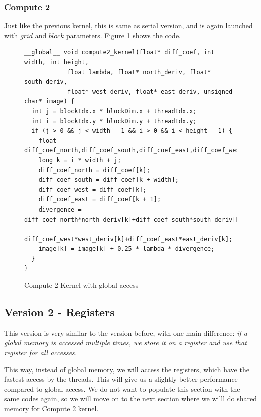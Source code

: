 \documentclass[12pt,reqno]{amsart}
\begin{document}
\clearpage

\subsubsection{Compute 2} 

Just like the previous kernel, this is same as serial version, and is again launched with $grid$ and $block$ parameters. Figure \ref{fig:c2kernel_reg} shows the code.

\begin{figure}[h]
\centering
\begin{lstlisting}
__global__ void compute2_kernel(float* diff_coef, int width, int height, 
            float lambda, float* north_deriv, float* south_deriv, 
            float* west_deriv, float* east_deriv, unsigned char* image) {
  int j = blockIdx.x * blockDim.x + threadIdx.x;
  int i = blockIdx.y * blockDim.y + threadIdx.y;
  if (j > 0 && j < width - 1 && i > 0 && i < height - 1) {
    float diff_coef_north,diff_coef_south,diff_coef_east,diff_coef_west,divergence;
    long k = i * width + j; 
    diff_coef_north = diff_coef[k];	
    diff_coef_south = diff_coef[k + width];	
    diff_coef_west = diff_coef[k];	
    diff_coef_east = diff_coef[k + 1];			
    divergence = diff_coef_north*north_deriv[k]+diff_coef_south*south_deriv[k]+
        diff_coef_west*west_deriv[k]+diff_coef_east*east_deriv[k];
    image[k] = image[k] + 0.25 * lambda * divergence; 
  }
}
\end{lstlisting}
\caption{Compute 2 Kernel with global access}
\label{fig:c2kernel_reg}
\end{figure}

\subsection{Version 2 - Registers}
This version is very similar to the version before, with one main difference: \textit{if a global memory is accessed multiple times, we store it on a register and use that register for all accesses.}

This way, instead of global memory, we will access the registers, which have the fastest access by the threads. This will give us a slightly better performance compared to global access. We do not want to populate this section with the same codes again, so we will move on to the next section where we willl do shared memory for Compute 2 kernel.
\end{document}
